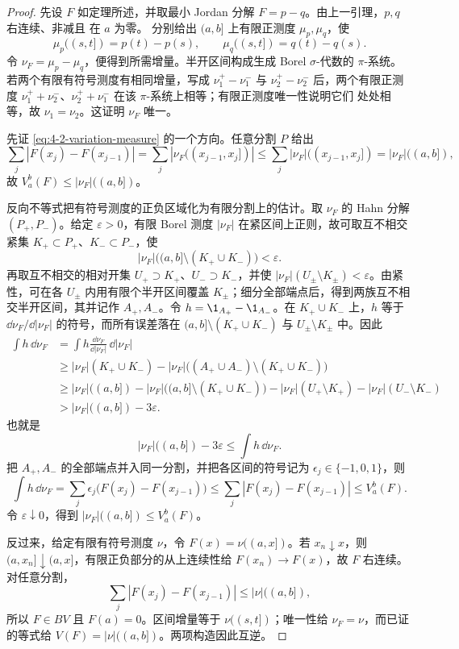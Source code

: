 \begin{proof}
先设 $F$ 如定理所述，并取最小 Jordan 分解 $F=p-q$。由上一引理，$p,q$ 右连续、非减且
在 $a$ 为零。 分别给出
$(a,b]$ 上有限正测度 $\mu_p,\mu_q$，使
\[
 \mu_p((s,t])=p(t)-p(s),\qquad
 \mu_q((s,t])=q(t)-q(s).
\]
令 $\nu_F=\mu_p-\mu_q$，便得到所需增量。半开区间构成生成 Borel $\sigma$-代数的
$\pi$-系统。若两个有限有符号测度有相同增量，写成 $\nu_1^+-\nu_1^-$ 与
$\nu_2^+-\nu_2^-$ 后，两个有限正测度
$\nu_1^++\nu_2^-$、$\nu_2^++\nu_1^-$ 在该 $\pi$-系统上相等；有限正测度唯一性说明它们
处处相等，故 $\nu_1=\nu_2$。这证明 $\nu_F$ 唯一。

先证 \eqref{eq:4-2-variation-measure} 的一个方向。任意分割 $P$ 给出
\[
 \sum_j|F(x_j)-F(x_{j-1})|
 =\sum_j|\nu_F((x_{j-1},x_j])|
 \le\sum_j|\nu_F|((x_{j-1},x_j])
 =|\nu_F|((a,b]),
\]
故 $V_a^b(F)\le|\nu_F|((a,b])$。

反向不等式把有符号测度的正负区域化为有限分割上的估计。取 $\nu_F$ 的 Hahn 分解
$(P_+,P_-)$。给定 $\varepsilon>0$，有限 Borel 测度 $|\nu_F|$ 在紧区间上正则，故可取互不相交
紧集 $K_+\subset P_+$、$K_-\subset P_-$，使
\[
 |\nu_F|\bigl((a,b]\setminus(K_+\cup K_-)\bigr)<\varepsilon.
\]
再取互不相交的相对开集 $U_+\supset K_+$、$U_-\supset K_-$，并使
$|\nu_F|(U_\pm\setminus K_\pm)<\varepsilon$。由紧性，可在各 $U_\pm$ 内用有限个半开区间覆盖
$K_\pm$；细分全部端点后，得到两族互不相交半开区间，其并记作 $A_+,A_-$。令
$h=\1_{A_+}-\1_{A_-}$。在 $K_+\cup K_-$ 上，$h$ 等于
$\dd\nu_F/\dd|\nu_F|$ 的符号，而所有误差落在
$(a,b]\setminus(K_+\cup K_-)$ 与 $U_\pm\setminus K_\pm$ 中。因此
\[
 \begin{aligned}
 \int h\,\dd\nu_F
 &=\int h\frac{\dd\nu_F}{\dd|\nu_F|}\,\dd|\nu_F|\\
 &\ge |\nu_F|(K_+\cup K_-)
      -|\nu_F|\bigl((A_+\cup A_-)\setminus(K_+\cup K_-)\bigr)\\
 &\ge |\nu_F|((a,b])
      -|\nu_F|\bigl((a,b]\setminus(K_+\cup K_-)\bigr)
      -|\nu_F|(U_+\setminus K_+)-|\nu_F|(U_-\setminus K_-)\\
 &>|\nu_F|((a,b])-3\varepsilon.
 \end{aligned}
\]
也就是
\[
 |\nu_F|((a,b])-3\varepsilon
 \le \int h\,\dd\nu_F.
\]
把 $A_+,A_-$ 的全部端点并入同一分割，并把各区间的符号记为 $\epsilon_j\in\{-1,0,1\}$，则
\[
 \int h\,\dd\nu_F
 =\sum_j\epsilon_j\bigl(F(x_j)-F(x_{j-1})\bigr)
 \le\sum_j|F(x_j)-F(x_{j-1})|
 \le V_a^b(F).
\]
令 $\varepsilon\downarrow0$，得到 $|\nu_F|((a,b])\le V_a^b(F)$。

反过来，给定有限有符号测度 $\nu$，令 $F(x)=\nu((a,x])$。若 $x_n\downarrow x$，则
$(a,x_n]\downarrow(a,x]$，有限正负部分的从上连续性给 $F(x_n)\to F(x)$，故 $F$ 右连续。
对任意分割，
\[
 \sum_j|F(x_j)-F(x_{j-1})|
 \le |\nu|((a,b]),
\]
所以 $F\in BV$ 且 $F(a)=0$。区间增量等于 $\nu((s,t])$；唯一性给
$\nu_F=\nu$，而已证的等式给 $V(F)=|\nu|((a,b])$。两项构造因此互逆。
\end{proof}

